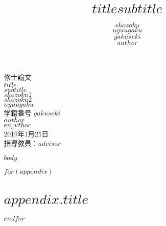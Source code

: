 \documentclass[a4paper,10.5pt]{jsreport}
\title{ \Large $title$\newline{\ddash}$subtitle${\ddash}}
\author{$shozoku$\\$nyuugaku$\\$gakuseki$\\$author$}
\date{}
\begin{document}
\begin{titlepage}

\begin{center}
\vspace*{100truept}
{\Large 修士論文}\\
\vspace{50truept}
{\LARGE $title$}\\ %
\vspace{10truept}
{\LARGE $subtitle$}\\ %
\vspace{80truept}
{\Large $shozoku1$}\\
{\Large $shozoku2$}\\
\vspace{20truept}
{\Large $nyuugaku$}\\ %
\vspace{20truept}
{\Large 学籍番号 $gakuseki$}\\
\vspace{20truept}
{\Large $author$}\\ %
{\Large $en_author$}\\ %
\vspace{10truept}
{\Large 2019年1月25日}\\ %
\vspace{20truept}
{\large
指導教員：$advisor$\\
}
\end{center}

\end{titlepage}

\tableofcontents

$body$

\printbibliography[title = 参考文献]


\appendix

$for(appendix)$
\chapter{$appendix.title$}

$endfor$
\end{document}
